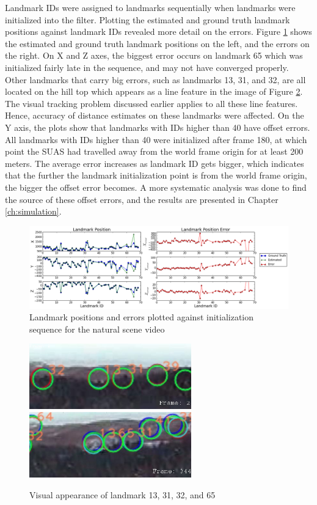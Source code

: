 Landmark IDs were assigned to landmarks sequentially when landmarks
were initialized into the filter. Plotting the estimated and ground
truth landmark positions against landmark IDs revealed more detail on
the errors. Figure \ref{fltfig:9} shows the estimated and ground truth
landmark positions on the left, and the errors on the right. On X and Z
axes, the biggest error occurs on landmark 65 which was
initialized fairly late in the sequence, and may not have converged
properly. Other landmarks that carry big errors, such as landmarks
13, 31, and 32, are all located on the hill top which appears as a line
feature in the image of Figure \ref{fltfig:line_features}. The visual
tracking problem discussed earlier applies to all these line features.
Hence, accuracy of distance estimates on these landmarks were
affected. On the Y axis, the plots show that landmarks with IDs higher
than 40 have offset errors. All landmarks with IDs higher than 40
were initialized after frame 180, at which point the SUAS had
travelled away from the world frame origin for at least 200 meters.
The average error increases as landmark ID gets bigger, which indicates
that the further the landmark initialization point is from the world
frame origin, the bigger the offset error becomes. A more systematic
analysis was done to find the source of these offset errors, and the
results are presented in Chapter \ref{ch:simulation}.

\begin{figure}[h]
\centering
\includegraphics[width=16cm, keepaspectratio=true]
{./Figures/fltfig/cut1/Figure60.png}
\caption{Landmark positions and errors plotted against initialization
  sequence for the natural scene video}
\label{fltfig:9}
\end{figure}

\begin{figure}[h]
\centering
\includegraphics[width=7cm, keepaspectratio=true]
{./Figures/fltfig/landmark_13_31_32.jpg}
\includegraphics[width=7cm, keepaspectratio=true]
{./Figures/fltfig/landmark_13_65_32.jpg}
\caption{Visual appearance of landmark 13, 31, 32, and 65}
\label{fltfig:line_features}
\end{figure}

